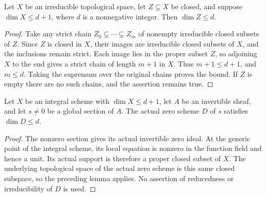 \begin{lemma}
\label{lem:seshadri-proper-closed-dimension-drop}
\leanok
Let $X$ be an irreducible topological space, let $Z\subsetneq X$ be
closed, and suppose $\dim X\leq d+1$, where $d$ is a nonnegative integer.
Then $\dim Z\leq d$.
\end{lemma}
\begin{proof}
Take any strict chain $Z_0\subsetneq\cdots\subsetneq Z_m$ of nonempty
irreducible closed subsets of $Z$. Since $Z$ is closed in $X$, their
images are irreducible closed subsets of $X$, and the inclusions remain
strict. Each image lies in the proper subset $Z$, so adjoining $X$ to
the end gives a strict chain of length $m+1$ in $X$. Thus $m+1\leq d+1$,
and $m\leq d$. Taking the supremum over the original chains proves the bound.
If $Z$ is empty there are no such chains, and the assertion remains true.
\end{proof}

\begin{lemma}
\label{lem:seshadri-original-section-dimension-drop}
\leanok
Let $X$ be an integral scheme with $\dim X\leq d+1$, let $A$ be an
invertible sheaf, and let $s\ne0$ be a global section of $A$.
The actual zero scheme $D$ of $s$ satisfies $\dim D\leq d$.
\end{lemma}
\begin{proof}
The nonzero section gives its actual invertible zero ideal. At the
generic point of the integral scheme, its local equation is nonzero in
the function field and hence a unit. Its actual support is therefore a
proper closed subset of $X$. The underlying topological space of the
actual zero scheme is this same closed subspace, so the preceding lemma
applies. No assertion of reducedness or irreducibility of $D$ is used.
\end{proof}
